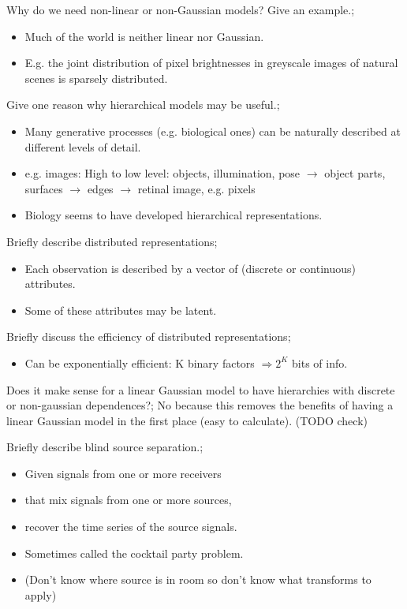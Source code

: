 \documentclass{article}
\begin{document}

Why do we need non-linear or non-Gaussian models? Give an example.; \begin{itemize} \item Much of the world is neither linear nor Gaussian. \item E.g. the joint distribution of pixel brightnesses in greyscale images of natural scenes is sparsely distributed. \end{itemize}

Give one reason why hierarchical models may be useful.; \begin{itemize} \item Many generative processes (e.g. biological ones) can be naturally described at different levels of detail.  \item e.g. images: High to low level: objects, illumination, pose $\rightarrow$ object parts, surfaces $\rightarrow$ edges $\rightarrow$ retinal image, e.g. pixels \item Biology seems to have developed hierarchical representations. \end{itemize}

Briefly describe distributed representations; \begin{itemize} \item Each observation is described by a vector of (discrete or continuous) attributes. \item Some of these attributes may be latent. \end{itemize}

Briefly discuss the efficiency of distributed representations; \begin{itemize} \item Can be exponentially efficient: K binary factors $\Rightarrow 2^K$ bits of info. \end{itemize}

Does it make sense for a linear Gaussian model to have hierarchies with discrete or non-gaussian dependences?; No because this removes the benefits of having a linear Gaussian model in the first place (easy to calculate). (TODO check)

Briefly describe blind source separation.; \begin{itemize} \item Given signals from one or more receivers  \item that mix signals from one or more sources, \item recover the time series of the source signals. \item Sometimes called the cocktail party problem. \item (Don't know where source is in room so don't know what transforms to apply) \end{itemize}
\end{document}
